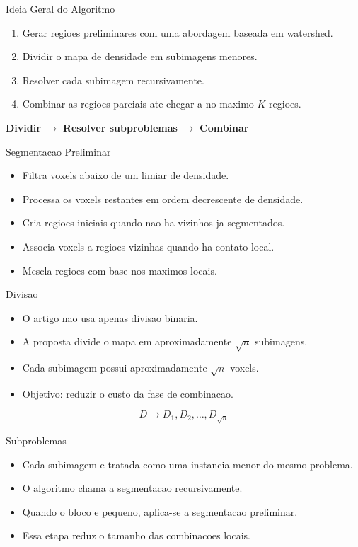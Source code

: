 \documentclass[aspectratio=169]{beamer}
\begin{document}
\begin{frame}{Ideia Geral do Algoritmo}
  \begin{enumerate}
    \item Gerar regioes preliminares com uma abordagem baseada em watershed.
    \item Dividir o mapa de densidade em subimagens menores.
    \item Resolver cada subimagem recursivamente.
    \item Combinar as regioes parciais ate chegar a no maximo $K$ regioes.
  \end{enumerate}

  \vspace{0.35cm}
  \centering
  \textbf{Dividir} $\rightarrow$ \textbf{Resolver subproblemas} $\rightarrow$ \textbf{Combinar}
\end{frame}

\begin{frame}{Segmentacao Preliminar}
  \begin{itemize}
    \item Filtra voxels abaixo de um limiar de densidade.
    \item Processa os voxels restantes em ordem decrescente de densidade.
    \item Cria regioes iniciais quando nao ha vizinhos ja segmentados.
    \item Associa voxels a regioes vizinhas quando ha contato local.
    \item Mescla regioes com base nos maximos locais.
  \end{itemize}
\end{frame}

\begin{frame}{Divisao}
  \begin{itemize}
    \item O artigo nao usa apenas divisao binaria.
    \item A proposta divide o mapa em aproximadamente $\sqrt{n}$ subimagens.
    \item Cada subimagem possui aproximadamente $\sqrt{n}$ voxels.
    \item Objetivo: reduzir o custo da fase de combinacao.
  \end{itemize}

  \vspace{0.3cm}
  \[
    D \rightarrow D_1, D_2, \ldots, D_{\sqrt{n}}
  \]
\end{frame}

\begin{frame}{Subproblemas}
  \begin{itemize}
    \item Cada subimagem e tratada como uma instancia menor do mesmo problema.
    \item O algoritmo chama a segmentacao recursivamente.
    \item Quando o bloco e pequeno, aplica-se a segmentacao preliminar.
    \item Essa etapa reduz o tamanho das combinacoes locais.
  \end{itemize}
\end{frame}
\end{document}
